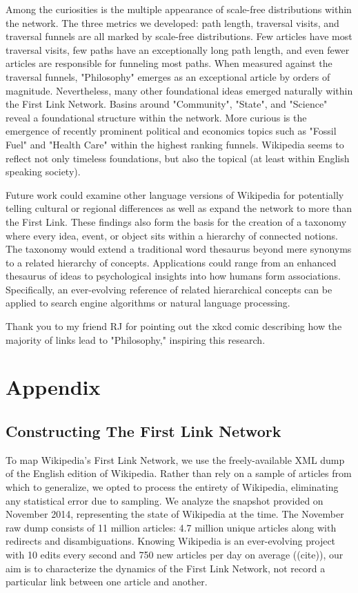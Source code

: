 \documentclass[pre,twocolumn,twoside,superscriptaddress,floatfix, aps, 10pt]{revtex4-1}
\begin{document}
Among the curiosities is the multiple appearance of scale-free distributions within the network. 
The three metrics we developed: path length, traversal visits, and traversal funnels are all marked 
by scale-free distributions. Few articles have most traversal visits, few paths have an exceptionally long path length, and even fewer
articles are responsible for funneling most paths. When measured against the traversal funnels, 
"Philosophy" emerges as an exceptional article by orders of magnitude. 
Nevertheless, many other foundational ideas emerged naturally within the First Link Network. 
Basins around "Community", "State", and "Science" reveal a foundational structure within the network. 
More curious is the emergence of recently prominent political and economics topics such as "Fossil Fuel" and "Health Care" 
within the highest ranking funnels. 
Wikipedia seems to reflect not only timeless foundations, but also the topical (at least within English speaking society).

Future work could examine other language versions of Wikipedia for potentially telling cultural or regional differences as well as expand the network to more than the First Link.
These findings also form the basis for the creation of a taxonomy where 
every idea, event, or object sits within a hierarchy of connected notions.
The taxonomy would extend a traditional word thesaurus beyond mere synonyms to a related hierarchy of concepts.
Applications could range from an enhanced thesaurus of ideas to psychological insights into how humans form associations.
Specifically, an ever-evolving reference of related hierarchical concepts can be applied to search engine algorithms 
or natural language processing.


\acknowledgments
Thank you to my friend RJ for pointing out the xkcd comic describing how the majority of links lead to "Philosophy," inspiring this research.


\newpage

\section{Appendix}

\subsection{Constructing The First Link Network}

To map Wikipedia's First Link Network, we use the freely-available XML dump of the English edition of Wikipedia. 
Rather than rely on a sample of articles from which to generalize, we opted to process the entirety of Wikipedia, 
eliminating any statistical error due to sampling.
We analyze the snapshot provided on November 2014, representing the state of Wikipedia at the time.
The November raw dump consists of 11 million articles: 4.7 million unique articles along with redirects
and disambiguations.
Knowing Wikipedia is an ever-evolving project with 10 edits every second and 750 new articles per day on average
((cite)), our aim is to characterize the dynamics of the First Link Network, not record a particular link between one
article and another.
\end{document}

